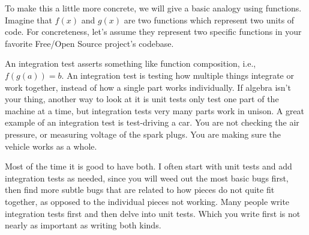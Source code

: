 To make this a little more concrete, we will give a basic analogy using
functions. Imagine that $f(x)$ and $g(x)$ are two functions which represent two units of code. For
concreteness, let's assume they represent two specific functions in your
favorite Free/Open Source project's codebase.

An integration test asserts something like function composition, i.e., $f(g(a)) =
b$. An integration test is testing how multiple
things integrate or work together, instead of how a single part works
individually. If algebra isn't your thing, another way to look at it is unit
tests only test one part of the machine at a time, but integration tests very
many parts work in unison. A great example of an integration test is test-driving a car.
You are not checking the air pressure, or measuring voltage of the spark plugs.
You are making sure the vehicle works as a whole.

Most of the time it is good to have both. I often start with unit tests and add
integration tests as needed, since you will weed out the most basic bugs first,
then find more subtle bugs that are related to how pieces do not quite fit
together, as opposed to the individual pieces not working. Many people write
integration tests first and then delve into unit tests. Which you write first
is not nearly as important as writing both kinds.
